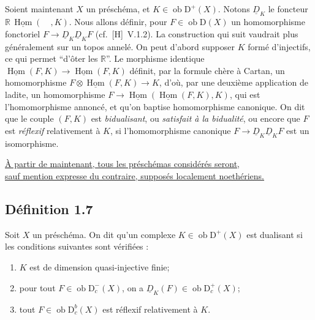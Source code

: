 \documentclass[11pt]{article}
\DeclareMathOperator{\Hom}{Hom}
\newcommand{\R}{\mathbb{R}}\newcommand{\RHomCore}{\mathbb{R}\mathrm{Hom}}
\newcommand{\D}{\mathrm{D}}
\newcommand{\ob}{\operatorname{ob}}
\providecommand{\Hom}{\operatorname{Hom}}
\providecommand{\ob}{\operatorname{ob}}
\providecommand{\R}{\mathrm R}
\providecommand{\Hom}{\operatorname{Hom}}
\begin{document}
Soient maintenant $X$ un préschéma, et $K \in \ob \D^{+}(X)$. Notons $\underline{D}_K$ le foncteur $\R\,\underline{\Hom}(\quad, K)$. Nous allons définir, pour $F \in \ob \D(X)$ un homomorphisme fonctoriel $F \to \underline{D}_K \underline{D}_K F$ (cf.~[H]~V.1.2). La construction qui suit vaudrait plus généralement sur un topos annelé. On peut d'abord supposer $K$
formé d'injectifs, ce qui permet ``d'ôter les $\R$''. Le morphisme identique $\underline{\Hom}(F,K) \to \underline{\Hom}(F,K)$ définit, par la formule chère à Cartan, un homomorphisme $F \otimes \underline{\Hom}(F,K) \to K$, d'où, par une deuxième application de ladite, un homomorphisme $F \to \underline{\Hom}(\underline{\Hom}(F,K), K)$, qui est l'homomorphisme annoncé, et qu'on baptise homomorphisme canonique. On dit que le couple $(F,K)$ est \emph{bidualisant}, ou \emph{satisfait à la bidualité}, ou encore que $F$ est \emph{réflexif} relativement à $K$, si l'homomorphisme canonique $F \to \underline{D}_K \underline{D}_K F$ est un isomorphisme.

\noindent\underline{À partir de maintenant, tous les préschémas considérés seront,}\\[-0.1em]\underline{sauf mention expresse du contraire, supposés localement noethériens.}

\subsection*{Définition 1.7}
Soit $X$ un préschéma. On dit qu'un complexe $K \in \ob \D^{+}(X)$ est dualisant si les conditions suivantes sont vérifiées :
\begin{enumerate}[label=(\roman*)]
\item $K$ est de dimension quasi-injective finie;
\item pour tout $F \in \ob \D_c^{-}(X)$, on a $\underline{D}_K(F) \in \ob \D_c^{+}(X)$;
\item tout $F \in \ob \D_c^{b}(X)$ est réflexif relativement à $K$.
\end{enumerate}
\end{document}
